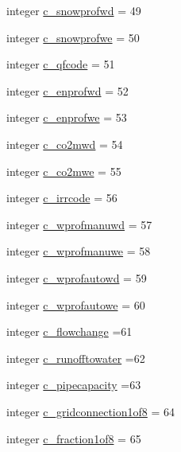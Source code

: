 \begin{DoxyCompactItemize}
\item 
integer \hyperlink{namespacecolnamesinputfiles_aecda68bffb8b94e304d69078f616d05a}{c\+\_\+snowprofwd} = 49
\item 
integer \hyperlink{namespacecolnamesinputfiles_a251ecc3acc1ca0dcae1be9dbc9885baf}{c\+\_\+snowprofwe} = 50
\item 
integer \hyperlink{namespacecolnamesinputfiles_a9c2f084e29ab3253aba16f25f6f57e6d}{c\+\_\+qfcode} = 51
\item 
integer \hyperlink{namespacecolnamesinputfiles_a30f510fdf83f7dfd68c79200fc219f72}{c\+\_\+enprofwd} = 52
\item 
integer \hyperlink{namespacecolnamesinputfiles_a760f8b98c76316c68bc97fcfd4acd92a}{c\+\_\+enprofwe} = 53
\item 
integer \hyperlink{namespacecolnamesinputfiles_a458ceb8fda92721080e551c95622d355}{c\+\_\+co2mwd} = 54
\item 
integer \hyperlink{namespacecolnamesinputfiles_aab9a964f8a068c45d8e4eb0bde1733ca}{c\+\_\+co2mwe} = 55
\item 
integer \hyperlink{namespacecolnamesinputfiles_a334ff4db36344c4e3aebd61f59639481}{c\+\_\+irrcode} = 56
\item 
integer \hyperlink{namespacecolnamesinputfiles_a8801ad8f0d01b5ecf6ffcbb91d2d1dc8}{c\+\_\+wprofmanuwd} = 57
\item 
integer \hyperlink{namespacecolnamesinputfiles_aa817b7d7af9c9c5cc29439f3da74e223}{c\+\_\+wprofmanuwe} = 58
\item 
integer \hyperlink{namespacecolnamesinputfiles_a0e3d887c82c9d58aa3907e3d53adbc74}{c\+\_\+wprofautowd} = 59
\item 
integer \hyperlink{namespacecolnamesinputfiles_a294f4adfdd15bb75ea3188f7fc150ab7}{c\+\_\+wprofautowe} = 60
\item 
integer \hyperlink{namespacecolnamesinputfiles_a9204c1d2e3a2d060af53f0ab1abacd16}{c\+\_\+flowchange} =61
\item 
integer \hyperlink{namespacecolnamesinputfiles_ad42336bef58759c0095ebca5fa4a45dd}{c\+\_\+runofftowater} =62
\item 
integer \hyperlink{namespacecolnamesinputfiles_a0c69a490bdd7669556955c9bbb07f185}{c\+\_\+pipecapacity} =63
\item 
integer \hyperlink{namespacecolnamesinputfiles_a2ea9c9a2febca1f86790acc7c1204557}{c\+\_\+gridconnection1of8} = 64
\item 
integer \hyperlink{namespacecolnamesinputfiles_ac2b1ccc8ae6ee69034ca23703f5557be}{c\+\_\+fraction1of8} = 65
\item 

\end{DoxyCompactItemize}
